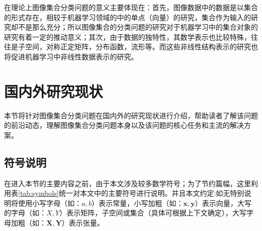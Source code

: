 在理论上图像集合分类问题的意义主要体现在：首先，图像数据中的数据是以集合的形式存在，相较于机器学习领域的中的单点（向量）的研究，集合作为输入的研究却不是那么充分；所以图像集合的分类问题的研究对于机器学习中的集合对象的研究有着一定的推动意义；其次，由于数据的独特性，其数学表示也比较特殊，往往是子空间，对称正定矩阵，分布函数，流形等。而这些非线性结构表示的研究也将促进机器学习中非线性数据表示的研究。
\section{国内外研究现状}
\label{sec:current}
本节将针对图像集合分类问题在国内外的研究现状进行介绍，帮助读者了解该问题的前沿动态，理解图像集合分类问题本身以及该问题的核心任务和主流的解决方案。
\subsection{符号说明}
\label{sec:symbols}
在进入本节的主要内容之前，由于本文涉及较多数学符号；为了节约篇幅，这里利用表\ref{tab:symbols}统一对本文中的主要符号进行说明。并且本文约定:如无特别说明将使用小写字母（如：$a,b$）表示常量，小写加粗（如：$\bm{x},\bm{y}$）表示向量，大写的字母（如：$X,Y$）表示矩阵，子空间或集合（具体可根据上下文确定），大写字母加粗（如：$\bm{X},\bm{Y}$）表示张量。
